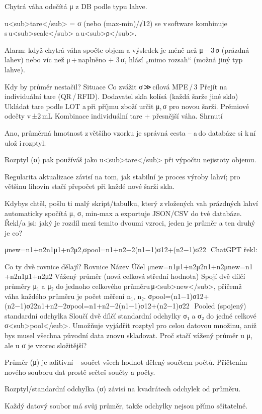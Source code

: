     Chytrá váha odečítá μ z DB podle typu lahve.

    u<sub>tare</sub> = σ (nebo (max‑min)/√12) se v software kombinuje s u<sub>scale</sub> a u<sub>ρ</sub>.

    Alarm: když chytrá váha spočte objem a výsledek je méně než μ − 3 σ (prázdná lahev) nebo víc než μ + naplněno + 3 σ, hlásí „mimo rozsah“ (možná jiný typ lahve).

Kdy by průměr nestačil?
Situace	Co zvážit
σ ≫ cílová MPE / 3	Přejít na individuální tare (QR / RFID).
Dodavatel skla kolísá (každá šarže jiné sklo)	Ukládat tare podle LOT a při příjmu zboží určit μ, σ pro novou šarži.
Prémiové odečty v ±2 mL	Kombinace individuální tare + přesnější váha.
Shrnutí

    Ano, průměrná hmotnost z většího vzorku je správná cesta – a do databáze si k ní ulož i rozptyl.

    Rozptyl (σ) pak používáš jako u<sub>tare</sub> při výpočtu nejistoty objemu.

    Regularita aktualizace závisí na tom, jak stabilní je proces výroby lahví; pro většinu lihovin stačí přepočet při každé nové šarži skla.

Kdybys chtěl, pošlu ti malý skript/tabulku, který z vložených vah prázdných lahví automaticky spočítá μ, σ, min‑max a exportuje JSON/CSV do tvé databáze.
Řekl/a jsi:
jaký je rozdíl mezi temito dvoumi vzroci, jeden je průměr a ten druhý je co?

μnew​=n1​+n2​n1​μ1​+n2​μ2​​,σpool​=n1​+n2​−2(n1​−1)σ12​+(n2​−1)σ22​​
​
ChatGPT řekl:

Co ty dvě rovnice dělají?
Rovnice	Název	Účel
μnew=n1μ1+n2μ2n1+n2μnew​=n1​+n2​n1​μ1​+n2​μ2​​	Vážený průměr (nová celková střední hodnota)	Spojí dvě dílčí průměry μ₁ a μ₂ do jednoho celkového průměru μ<sub>new</sub>, přičemž váha každého průměru je počet měření n₁, n₂.
σpool=(n1−1)σ12+(n2−1)σ22n1+n2−2σpool​=n1​+n2​−2(n1​−1)σ12​+(n2​−1)σ22​​
​	Pooled (spojený) standardní odchylka	Sloučí dvě dílčí standardní odchylky σ₁ a σ₂ do jedné celkové σ<sub>pool</sub>. Umožňuje vyjádřit rozptyl pro celou datovou množinu, aniž bys musel všechna původní data znovu skladovat.
Proč stačí vážený průměr u μ, ale u σ je vzorec složitější?

    Průměr (μ) je aditivní – součet všech hodnot dělený součtem počtů. Přičtením nového souboru dat prostě sečteš součty a počty.

    Rozptyl/standardní odchylka (σ) závisí na kvadrátech odchylek od průměru.

        Každý datový soubor má svůj průměr, takže odchylky nejsou přímo sčítatelné.

